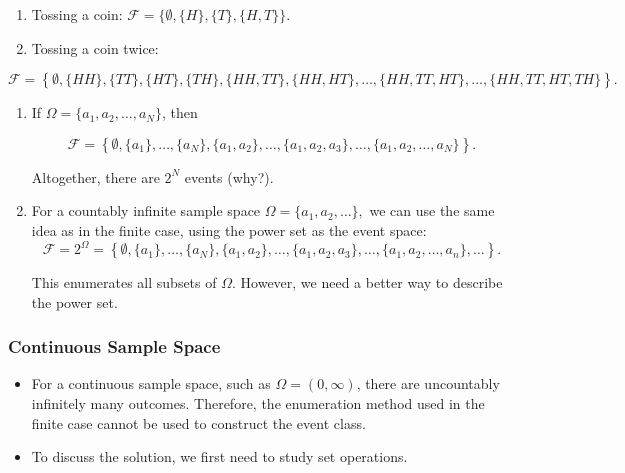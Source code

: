 \begin{example}\begin{enumerate}
\item Tossing a coin:
$\mathcal{F} = \{\emptyset,\{H\},\{T\},\{H,T\}\}.$
\item Tossing a coin twice:
\end{enumerate}
\begin{equation*}
\mathcal{F}
   =
   \left\{
   \emptyset,
   \{HH\},
   \{TT\},
   \{HT\},
   \{TH\},
   \{HH,TT\},
   \{HH,HT\},
   \ldots,
   \{HH,TT,HT\},
   \ldots,
   \{HH,TT,HT,TH\}
   \right\}.
\end{equation*}

\begin{enumerate}[resume]
\item If $\Omega=\{a_1,a_2,\ldots,a_N\}$, then

\begin{equation*}
\mathcal{F}
   =
   \left\{
   \emptyset,
   \{a_1\},
   \ldots,
   \{a_N\},
   \{a_1,a_2\},
   \ldots,
   \{a_1,a_2,a_3\},
   \ldots,
   \{a_1,a_2,\ldots,a_N\}
   \right\}.
\end{equation*}

Altogether, there are $2^N$ events (why?).


\item For a countably infinite sample space
$\Omega=\{a_1,a_2,\ldots\},$
we can use the same idea as in the finite case, using the power set as the event space:
\begin{equation*}
\mathcal{F}
   =
   2^\Omega
   =
   \left\{
   \emptyset,
   \{a_1\},
   \ldots,
   \{a_N\},
   \{a_1,a_2\},
   \ldots,
   \{a_1,a_2,a_3\},
   \ldots,
   \{a_1,a_2,\ldots,a_n\},
   \ldots
   \right\}.
\end{equation*}

This enumerates all subsets of $\Omega$. However, we need a better way to describe the power set.
\end{enumerate}

\end{example}\subsubsection{Continuous Sample Space}

\begin{itemize}
\item For a continuous sample space, such as $\Omega=(0,\infty)$, there are uncountably infinitely many outcomes. Therefore, the enumeration method used in the finite case cannot be used to construct the event class.
\item To discuss the solution, we first need to study set operations.
\end{itemize}

